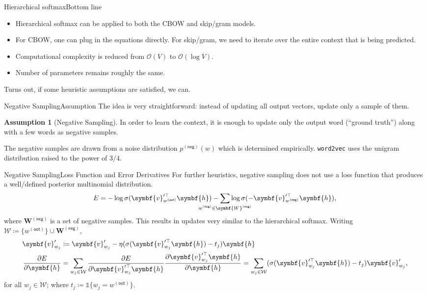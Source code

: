 \documentclass[usepdftitle=false]{beamer}
\theoremstyle{definition}
\newtheorem{assumption}{Assumption}
\renewcommand*{\vec}{\symbf}%
\newcommand*{\mat}{\symbf}%
\newcommand*{\trans}{\top}%
\newcommand*{\BigOh}{\mathcal{O}}%
\newcommand*{\outs}{\mathsf{(out)}}
\newcommand*{\negs}{\mathsf{(neg)}}
\begin{document}
\begin{frame}{Hierarchical softmax}{Bottom line}
  \begin{itemize}
  \item Hierarchical softmax can be applied to both the CBOW and
    skip\-/gram models.
  \item For CBOW, one can plug in the equations directly.  For
    skip\-/gram, we need to iterate over the entire context that is
    being predicted.
  \item Computational complexity is reduced from \(\BigOh(V)\) to
    \(\BigOh(\log V)\).
  \item Number of parameters remains roughly the same.
  \end{itemize}

    Turns out, if some heuristic
  assumptions are satisfied, we can.
\end{frame}

\begin{frame}{Negative Sampling}{Assumption}
  The idea is very straightforward: instead of updating all output
  vectors, update only a sample of them.
  \begin{assumption}[Negative Sampling]
    In order to learn the context, it is enough to update only the
    output word (\enquote{ground truth}) along with a few words as
    negative samples.
  \end{assumption}
  The negative samples are drawn from a noise distribution
  \(p^{\negs}(w)\) which is determined empirically.  \Verb+word2vec+
  uses the unigram distribution raised to the power of \(3 / {4}\).
\end{frame}

\begin{frame}{Negative Sampling}{Loss Function and Error Derivatives}
  For further heuristics, negative sampling does not use a loss
  function that produces a well\-/defined posterior multinomial
  distribution.
  \[
    E = -\log \sigma(\vec{v}^{\prime\trans}_{w^{\outs}} \vec{h}) -
    \sum_{\mathclap{w^{\negs} \in \mat{W}^{\negs}}} \log
    \sigma(-\vec{v}^{\prime\trans}_{w^{\negs}} \vec{h})\text{,}
  \]
  where \(\mat{W}^{\negs}\) is a set of negative samples.  This
  results in updates very similar to the hierarchical softmax.
  Writing
  \(\mathcal{W} \coloneqq \{w^{\outs}\} \cup \mat{W}^{\negs}\),
  \begin{align*}
    \vec{v}'_{w_j}%
    &
      \coloneqq \vec{v}'_{w_j} -
      \eta (\sigma(\vec{v}^{\prime\trans}_{w_j} \vec{h}) - t_j) \vec{h}\\
    \frac{\partial E}{\partial \vec{h}}%
    &=
      \sum_{w_j \in \mathcal{W}}
      \frac{\partial E}{\partial \vec{v}^{\prime\trans}_{w_j} \vec{h}}
      \frac{\partial \vec{v}^{\prime\trans}_{w_j} \vec{h}}{\partial \vec{h}}
      =
      \sum_{w_j \in \mathcal{W}}
      (\sigma(\vec{v}^{\prime\trans}_{w_j} \vec{h}) - t_j) \vec{v}'_{w_j}\text,
  \end{align*}
  for all \(w_j \in \mathcal{W}\); where
  \(t_j \coloneqq \mathbb{1}\{w_j = w^{\outs}\}\).
\end{frame}
\end{document}
